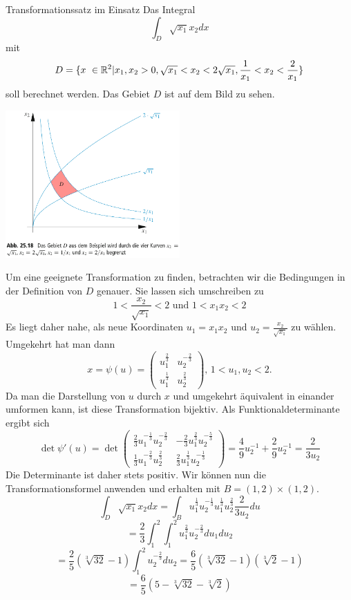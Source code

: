 \begin{Beispiel}{Transformationssatz im Einsatz}
Das Integral $$\int_D \sqrt{x_1}x_2 dx$$ mit $$D=\{ x\ \in\mathbb{R}^2 | x_1, x_2 >0, \sqrt{x_1}<x_2<2\sqrt{x_1}, \frac{1}{x_1}<x_2<\frac{2}{x_1}\}$$
soll berechnet werden. Das Gebiet $D$ ist auf dem Bild zu sehen. \\
            \begin{center}
    \includegraphics[width=0.50\textwidth]{Dateien/Transformationssatz.png}
\end{center}
Um eine geeignete Transformation zu finden, betrachten wir die Bedingungen in der Definition von $D$ genauer. Sie lassen sich umschreiben zu
$$1<\frac{x_2}{\sqrt{x_1}}<2 \mbox{ und } 1<x_1x_2<2$$
Es liegt daher nahe, als neue Koordinaten $u_1=x_1x_2$ und $u_2=\frac{x_2}{\sqrt{x_1}}$ zu wählen. Umgekehrt hat man dann
$$x=\psi(u)=\begin{pmatrix}
    u_1^{\frac{2}{3}} & u_2^{-\frac{2}{3}} \\
    u_1^{\frac{1}{3}} & u_2^{\frac{2}{3}}
\end{pmatrix} \mbox{, $1<u_1, u_2 < 2$.}$$
Da man die Darstellung von $u$ durch $x$ und umgekehrt äquivalent in einander umformen kann, ist diese Transformation bijektiv. Als Funktionaldeterminante ergibt sich
$$\det \psi '(u)=\det \begin{pmatrix}
    \frac{2}{3}u_1^{{-\frac{1}{3}}}u_2^{-{\frac{2}{3}}} & -\frac{2}{3}u_1^{\frac{2}{3}}u_2^{-{\frac{5}{3}}} \\
    \frac{1}{3}u_1^{-{\frac{2}{3}}}u_2^{\frac{2}{3}} & {\frac{2}{3}}u_1^{\frac{1}{3}}u_2^{-\frac{1}{3}}
\end{pmatrix}=\frac{4}{9}u_2^{-1}+\frac{2}{9}u_2^{-1}=\frac{2}{3u_2}$$
Die Determinante ist daher stets positiv. Wir können nun die Transformationsformel anwenden und erhalten mit $B=(1,2)\times(1,2)$.
$$\int_D \sqrt{x_1}x_2 dx = \int_B u_1^{\frac{1}{3}}u_2^{-\frac{1}{3}}u_1^{\frac{1}{3}}u_2^{\frac{2}{3}}\frac{2}{3u_2}du$$
$$=\frac{2}{3}\int_1^2 \int_1^2 u_1^{\frac{2}{3}}u_2^{-\frac{2}{3}}du_1du_2$$
$$=\frac{2}{5}(\sqrt[3]{32}-1)\int_1^2 u_2^{-{\frac{2}{3}}}du_2=\frac{6}{5}(\sqrt[3]{32}-1)(\sqrt[3]{2}-1)$$
$$=\frac{6}{5}(5-\sqrt[3]{32}-\sqrt[3]{2})$$

\end{Beispiel}
\newpage
